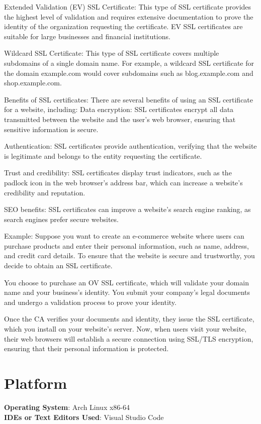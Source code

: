 \documentclass[11pt]{article}
\begin{document}
Extended Validation (EV) SSL Certificate: This type of SSL certificate provides the highest level of validation and requires extensive documentation to prove the identity of the organization requesting the certificate. EV SSL certificates are suitable for large businesses and financial institutions.

Wildcard SSL Certificate: This type of SSL certificate covers multiple subdomains of a single domain name. For example, a wildcard SSL certificate for the domain example.com would cover subdomains such as blog.example.com and shop.example.com.

Benefits of SSL certificates:
There are several benefits of using an SSL certificate for a website, including:
Data encryption: SSL certificates encrypt all data transmitted between the website and the user's web browser, ensuring that sensitive information is secure.

Authentication: SSL certificates provide authentication, verifying that the website is legitimate and belongs to the entity requesting the certificate.

Trust and credibility: SSL certificates display trust indicators, such as the padlock icon in the web browser's address bar, which can increase a website's credibility and reputation.

SEO benefits: SSL certificates can improve a website's search engine ranking, as search engines prefer secure websites.

Example:
Suppose you want to create an e-commerce website where users can purchase products and enter their personal information, such as name, address, and credit card details. To ensure that the website is secure and trustworthy, you decide to obtain an SSL certificate.

You choose to purchase an OV SSL certificate, which will validate your domain name and your business's identity. You submit your company's legal documents and undergo a validation process to prove your identity.

Once the CA verifies your documents and identity, they issue the SSL certificate, which you install on your website's server. Now, when users visit your website, their web browsers will establish a secure connection using SSL/TLS encryption, ensuring that their personal information is protected.

\section{Platform}
\textbf{\textbf{Operating System}}: Arch Linux x86-64 \\
\textbf{\textbf{IDEs or Text Editors Used}}: Visual Studio Code\\
\end{document}
